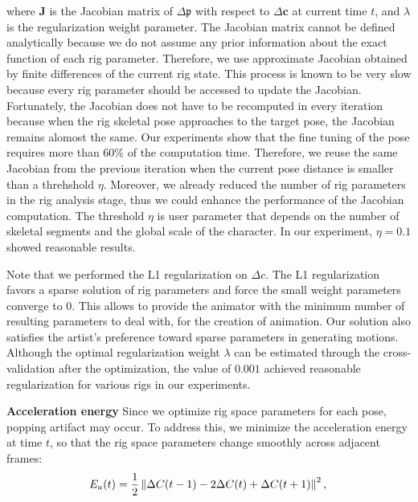 where $\mathbf{J}$ is the Jacobian matrix of $\Delta \mathfrak{p}$ with respect to $\Delta\mathbf{c}$ at current time $t$, and $\lambda$ is the regularization weight parameter. The Jacobian matrix cannot be defined analytically because we do not assume any prior information about the exact function of each rig parameter. Therefore, we use approximate Jacobian obtained by finite differences of the current rig state. This process is known to be very slow\cite{hahn2012rig} because every rig parameter should be accessed to update the Jacobian. Fortunately, the Jacobian does not have to be recomputed in every iteration because when the rig skeletal pose approaches to the target pose, the Jacobian remains alomost the same. Our experiments show that the fine tuning of the pose requires more than 60\% of the computation time. Therefore, we reuse the same Jacobian from the previous iteration when the current pose distance is smaller than a threhshold $\eta$. Moreover, we already reduced the number of rig parameters in the rig analysis stage, thus we could enhance the performance of the Jacobian computation. The threshold $\eta$ is user parameter that depends on the number of skeletal segments and the global scale of the character. In our experiment, $\eta = 0.1$ showed reasonable results.

Note that we performed the L1 regularization on $\Delta{c}$. The L1 regularization favors a sparse solution of rig parameters and force the small weight parameters converge to 0. This allows to provide the animator with the minimum number of resulting parameters to deal with, for the creation of animation.
Our solution also satisfies the artist's preference toward sparse parameters in generating motions\cite{seol2011artist}. Although the optimal regularization weight $\lambda$ can be estimated through the cross-validation after the optimization, the value of $0.001$ achieved reasonable regularization for various rigs in our experiments.

\textbf{Acceleration energy}
Since we optimize rig space parameters for each pose, popping artifact may occur. To address this, we minimize the acceleration energy at time $t$, so that the rig space parameters change smoothly across adjacent frames:
\begin{equation}
E_{a}(t) = \frac{1}{2}\left \| \Delta C(t-1)-2\Delta C(t)+\Delta C(t+1) \right \|^{2}, \\
\end{equation}

